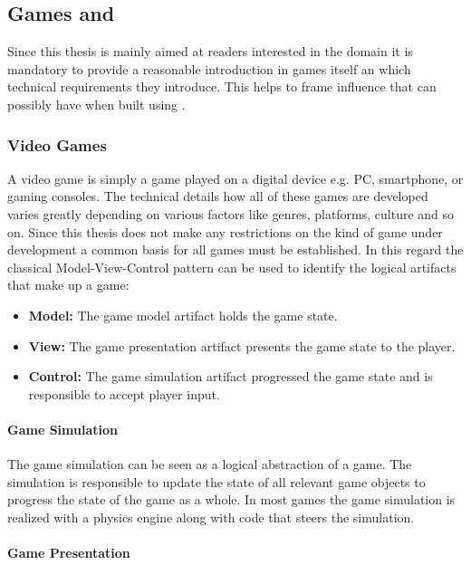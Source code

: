 \subsection{Games and \ogs{}}
\label{sub:games}

Since this thesis is mainly aimed at readers interested in the \ms{} domain it
is mandatory to provide a reasonable introduction in games itself an which
technical requirements they introduce. This helps to frame influence that \ogs{}
can possibly have when built using \mss{}.

\subsubsection{Video Games}

A video game is simply a game played on a digital device e.g. PC, smartphone, or
gaming consoles. The technical details how all of these games are developed
varies greatly depending on various factors like genres, platforms, culture and
so on. Since this thesis does not make any restrictions on the kind of game
under development a common basis for all games must be established. In this
regard the classical Model-View-Control pattern can be used to identify the
logical artifacts that make up a game: 

\begin{itemize}
  \item \textbf{Model:} The game model artifact holds the game state.
  \item \textbf{View:} The game presentation artifact presents the game state to
  the player.
  \item \textbf{Control:} The game simulation artifact progressed the game
  state and is responsible to accept player input.
\end{itemize}

\paragraph{Game Simulation}

The game simulation can be seen as a logical abstraction of a game. The
simulation is responsible to update the state of all relevant game objects to
progress the state of the game as a whole. In most games the game simulation is
realized with a physics engine along with code that steers the simulation.

\paragraph{Game Presentation}

